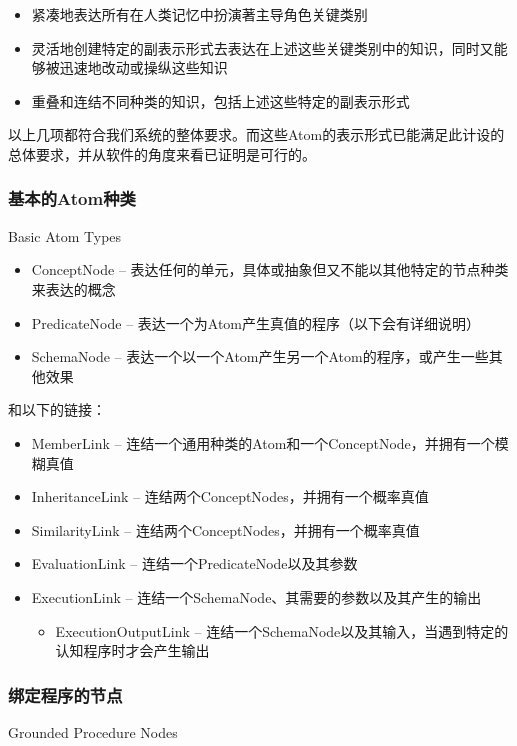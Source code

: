 \begin{itemize}
\item 紧凑地表达所有在人类记忆中扮演著主导角色关键类别
\item 灵活地创建特定的副表示形式去表达在上述这些关键类别中的知识，同时又能够被迅速地改动或操纵这些知识
\item 重叠和连结不同种类的知识，包括上述这些特定的副表示形式
\end{itemize}

\noindent 以上几项都符合我们系统的整体要求。而这些Atom的表示形式已能满足此计设的总体要求，并从软件的角度来看已证明是可行的。

\subsubsection{基本的Atom种类}{Basic Atom Types}

\begin{itemize}
\item ConceptNode -- 表达任何的单元，具体或抽象但又不能以其他特定的节点种类来表达的概念
\item PredicateNode  -- 表达一个为Atom产生真值的程序（以下会有详细说明）
\item SchemaNode -- 表达一个以一个Atom产生另一个Atom的程序，或产生一些其他效果
\end{itemize}

和以下的链接：

\begin{itemize}
\item MemberLink -- 连结一个通用种类的Atom和一个ConceptNode，并拥有一个模糊真值
\item InheritanceLink -- 连结两个ConceptNodes，并拥有一个概率真值
\item SimilarityLink -- 连结两个ConceptNodes，并拥有一个概率真值
\item EvaluationLink -- 连结一个PredicateNode以及其参数
\item ExecutionLink -- 连结一个SchemaNode、其需要的参数以及其产生的输出
\begin{itemize}
\item ExecutionOutputLink -- 连结一个SchemaNode以及其输入，当遇到特定的认知程序时才会产生输出
\end{itemize}
\end{itemize}

\subsubsection{绑定程序的节点}{Grounded Procedure Nodes}

